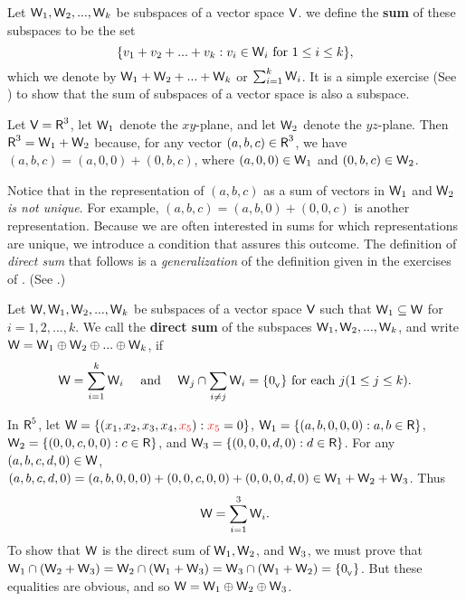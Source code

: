 \begin{definition} \label{def 5.8}
Let \(\textsf{W}_1, \textsf{W}_2, ..., \textsf{W}_k\) be subspaces of a vector space \(\textsf{V}\). we define the \textbf{sum} of these subspaces to be the set
\[
    \{ v_1 + v_2 + ... + v_k : v_i \in \textsf{W}_i \text{ for } 1 \le i \le k \},
\]
which we denote by \(\textsf{W}_1 + \textsf{W}_2 + ... + \textsf{W}_k\) or \(\sum_{i = 1}^k \textsf{W}_i\).
It is a simple exercise (See ) to show that the sum of subspaces of a vector space is also a subspace.
\end{definition}

\begin{example} \label{example 5.2.8}
Let \(\textsf{V} = \textsf{R}^3\), let \(\textsf{W}_1\) denote the \(xy\)-plane, and let \(\textsf{W}_2\) denote the \(yz\)-plane.
Then \(\textsf{R}^3 = \textsf{W}_1 + \textsf{W}_2\) because, for any vector \((a, b, c) \in \textsf{R}^3\),
we have \((a, b, c) = (a, 0, 0) + (0, b, c)\), where \((a, 0, 0) \in \textsf{W}_1\) and \((0, b, c) \in \textsf{W}_2\).
\end{example}

Notice that in  the representation of \((a, b, c)\) as a sum of vectors in \(\textsf{W}_1\) and \(\textsf{W}_2\) \emph{is not unique}.
For example, \((a, b, c) = (a, b, 0) + (0, 0, c)\) is
another representation.
Because we are often interested in sums for which representations are unique, we introduce a condition that assures this outcome.
The definition of \emph{direct sum} that follows is a \emph{generalization} of the definition given in the exercises of .
(See .)

\begin{definition} \label{def 5.9}
Let \(\textsf{W}, \textsf{W}_1, \textsf{W}_2, ..., \textsf{W}_k\) be subspaces of a vector space \(\textsf{V}\) such that \(\textsf{W}_1 \subseteq \textsf{W}\) for \(i = 1, 2, ..., k\).
We call \W the \textbf{direct sum} of the subspaces \(\textsf{W}_1, \textsf{W}_2, ..., \textsf{W}_k\), and write \(\textsf{W} = \textsf{W}_1 \oplus \textsf{W}_2 \oplus ... \oplus \textsf{W}_k\), if
\[
    \textsf{W} = \sum_{i = 1}^k \textsf{W}_i \quad \text{ and } \quad \textsf{W}_j \cap \sum_{i \ne j} \textsf{W}_i = \{ 0_{_{\textsf{V}}} \} \text{ for each } j (1 \le j \le k).
\]
\end{definition}

\begin{example} \label{example 5.2.9}
In \(\textsf{R}^5\), let \(\W = \{(x_1, x_2, x_3, x_4, \RED{x_5}) : \RED{x_5} = 0 \}\),
\(\textsf{W}_1 = \{(a, b, 0, 0, 0): a, b \in \textsf{R} \}\), \(\textsf{W}_2 = \{ (0, 0, c, 0, 0): c \in \textsf{R}\}\),
and \(\textsf{W}_3 = \{(0, 0, 0, d, 0): d \in \textsf{R} \}\).
For any \((a, b, c, d, 0) \in \textsf{W}\),
\((a, b, c, d, 0) = (a, b, 0, 0, 0) + (0, 0, c, 0, 0) + (0, 0, 0, d, 0) \in \textsf{W}_1 + \textsf{W}_2 + \textsf{W}_3\).
Thus
\[
    \textsf{W} = \sum_{i = 1}^3 \textsf{W}_i.
\]
To show that \(\textsf{W}\) is the direct sum of \(\textsf{W}_1, \textsf{W}_2\), and \(\textsf{W}_3\), we must prove that \(\textsf{W}_1 \cap (\textsf{W}_2 + \textsf{W}_3) = \textsf{W}_2 \cap (\textsf{W}_1 + \textsf{W}_3) = \textsf{W}_3 \cap (\textsf{W}_1 + \textsf{W}_2) = \{ 0_{_{\textsf{V}}} \}\).
But these equalities are obvious, and so \(\textsf{W} = \textsf{W}_1 \oplus \textsf{W}_2 \oplus \textsf{W}_3\).
\end{example}

